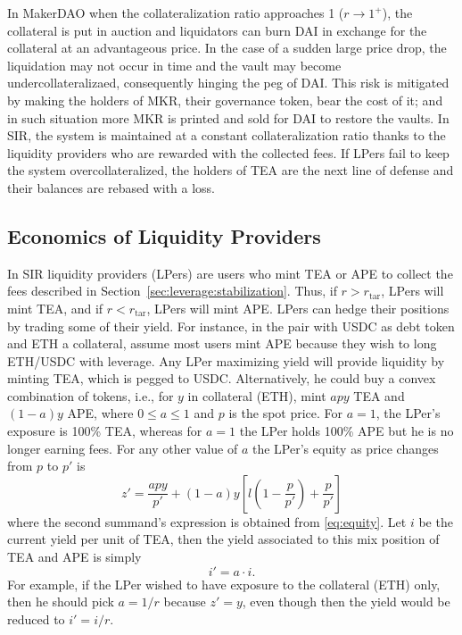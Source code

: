 \documentclass[journal,letterpaper,oneside,onecolumn,12pt]{IEEEtran}
\begin{document}
	
	In MakerDAO when the collateralization ratio approaches 1 ($r\rightarrow1^+$), the collateral is put in auction and liquidators can burn DAI in exchange for the collateral at an advantageous price. In the case of a sudden large price drop, the liquidation may not occur in time and the vault may become undercollateralizaed, consequently hinging the peg of DAI. This risk is mitigated by making the holders of MKR, their governance token, bear the cost of it; and in such situation more MKR is printed and sold for DAI to restore the vaults.
	In SIR, the system is maintained at a constant collateralization ratio thanks to the liquidity providers who are rewarded with the collected fees. If LPers fail to keep the system overcollateralized, the holders of TEA are the next line of defense and their balances are rebased with a loss.
	
	
	
	\subsection{Economics of Liquidity Providers}
	
	In SIR liquidity providers (LPers) are users who mint TEA or APE to collect the fees described in Section~\ref{sec:leverage:stabilization}. Thus, if $r>r_\textrm{tar}$, LPers will mint TEA, and if $r<r_\textrm{tar}$, LPers will mint APE. 	
	LPers can hedge their positions by trading some of their yield. For instance, in the pair with USDC as debt token and ETH a collateral, assume most users mint APE because they wish to long ETH/USDC with leverage. Any LPer maximizing yield will provide liquidity by minting TEA, which is pegged to USDC. Alternatively, he could buy a convex combination of tokens, i.e., for $y$ in collateral (ETH), mint $apy$ TEA and $(1-a)y$ APE, where $0\leq a\leq1$ and $p$ is the spot price. For $a=1$, the LPer's exposure is 100\% TEA, whereas for $a=1$ the LPer holds 100\% APE but he is no longer earning fees. For any other value of $a$ the LPer's equity as price changes from $p$ to $p'$ is
	\begin{equation}
		z' = \frac{apy}{p'}+(1-a)y\left[l\left(1-\frac{p}{p'}\right)+\frac{p}{p'}\right]
	\end{equation}
	where the second summand's expression is obtained from \eqref{eq:equity}. Let $i$ be the current yield per unit of TEA, then the yield associated to this mix position of TEA and APE is simply
	\begin{equation}
		i' = a\cdot i.
	\end{equation}
	For example, if the LPer wished to have exposure to the collateral (ETH) only, then he should pick $a=1/r$ because $z'=y$, even though then the yield would be reduced to $i'=i/r$.
	
\end{document}
